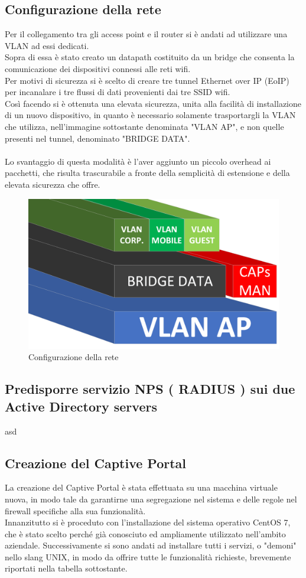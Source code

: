 \documentclass[Realizzazione.tex]{subfiles}
\begin{document}
\subsection{Configurazione della rete}
Per il collegamento tra gli access point e il router si è andati ad utilizzare una VLAN ad essi dedicati. \\
Sopra di essa è stato creato un datapath costituito da un bridge che consenta la comunicazione dei dispositivi connessi alle reti wifi. \\
Per motivi di sicurezza si è scelto di creare tre tunnel Ethernet over IP (EoIP) per incanalare i tre flussi di dati provenienti dai tre SSID wifi. \\
Così facendo si è ottenuta una elevata sicurezza, unita alla facilità di installazione di un nuovo dispositivo, in quanto è necessario solamente trasportargli la VLAN che utilizza, nell'immagine sottostante denominata "VLAN AP", e non quelle presenti nel tunnel, denominato "BRIDGE DATA". \\\\
Lo svantaggio di questa modalità è l'aver aggiunto un piccolo overhead ai pacchetti, che risulta trascurabile a fronte della semplicità di estensione e della elevata sicurezza che offre.

\begin{figure}[H]
	\centering
	\includegraphics[width=0.6\linewidth]{"images/VLAN"}
	\caption{Configurazione della rete}
	\label{fig:Configurazione della rete}
\end{figure}

\subsection{Predisporre servizio NPS ( RADIUS ) sui due Active Directory servers} 
asd
\subsection{Creazione del Captive Portal}
La creazione del Captive Portal è stata effettuata su una macchina virtuale nuova, in modo tale da garantirne una segregazione nel sistema e delle regole nel firewall specifiche alla sua funzionalità. \\
Innanzitutto si è proceduto con l'installazione del sistema operativo CentOS 7, che è stato scelto perché già conosciuto ed ampliamente utilizzato nell'ambito aziendale.
Successivamente si sono andati ad installare tutti i servizi, o "demoni" nello slang UNIX, in modo da offrire tutte le funzionalità richieste, brevemente riportati nella tabella sottostante.
\end{document}
